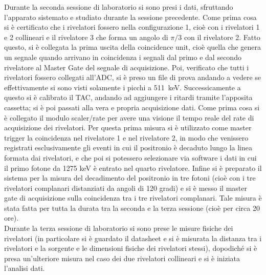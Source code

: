 Durante la seconda sessione di laboratorio si sono presi i dati, sfruttando l'apparato sistemato e studiato durante la sessione precedente. Come prima cosa si è
certificato che i rivelatori fossero nella configurazione 1, cioè con i rivelatori 1 e 2 collineari e il rivelatore 3 che forma un angolo di $\pi/3$ con il
rivelatore 2. Fatto questo, si è collegata la prima uscita della coincidence unit, cioè quella che genera un segnale quando arrivano in coincidenza i segnali
dal primo e dal secondo rivelatore al Master Gate del segnale di acquisizione. Poi, verificato che tutti i rivelatori fossero collegati all'ADC, si
è preso un file di prova andando a vedere se effettivamente si sono visti solamente i picchi a 511~keV. Successicamente a questo si è calibrato il TAC, andando ad aggiungere
i ritardi tramite l'apposita cassetta; si è poi passati alla vera e propria acquisizione dati. Come prima cosa si è collegato il modulo scaler/rate per avere una visione il tempo
reale del rate di acquisizione dei rivelatori. Per questa prima misura si è utilizzato come master trigger la coincidenza nel rivelatore 1 e nel rivelatore 2, in modo
che venissero registrati esclusivamente gli eventi in cui il positronio è decaduto lungo la linea formata dai rivelatori, e che poi si potessero selezionare via software
i dati in cui il primo fotone da 1275 keV è entrato nel quarto rivelatore. Infine si è preparato il sistema per la misura del decadimento del positronio in tre fotoni (cioè
con i tre rivelatori complanari distanziati da angoli di 120 gradi) e si è messo il master gate di acquisizione sulla coincidenza tra i tre rivelatori complanari. Tale
misura è stata fatta per tutta la durata tra la seconda e la terza sessione (cioè per circa 20 ore).\\

Durante la terza sessione di laboratorio si sono prese le misure fisiche dei rivelatori (in particolare si è guardato il datasheet e si è misurata la distanza tra
i rivelatori e la sorgente e le dimensioni fisiche dei rivelatori stessi), dopodiché si è presa un'ulteriore misura nel caso dei due rivelatori collineari e si è iniziata
l'analisi dati. 
